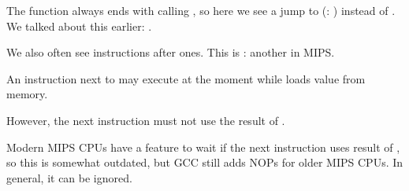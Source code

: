 



The function always ends with calling \puts, so here we see a jump to \puts (: ) instead of .
We talked about this earlier: .

We also often see  instructions after  ones.
This is : another  in MIPS.

An instruction next to  may execute at the moment while  loads value from memory. 

However, the next instruction must not use the result of .

Modern MIPS CPUs have a feature to wait if the next instruction uses result of , so this is somewhat outdated,
but GCC still adds NOPs for older MIPS CPUs.
In general, it can be ignored.
